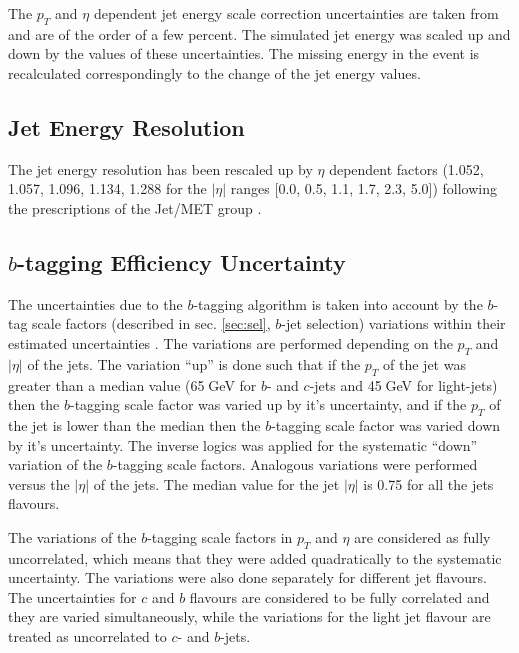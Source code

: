 The $p_{T}$ and $\eta$ dependent jet energy scale correction uncertainties are taken from \cite{CMS-PAS-JME-10-010} and are of the
order of a few percent. The simulated jet energy was scaled up and down by the values of these uncertainties. The missing energy in the 
event is recalculated correspondingly to the change of the jet energy values.

\subsection{Jet Energy Resolution}

The jet energy resolution has been rescaled up by $\eta$ dependent factors (1.052, 1.057, 1.096, 1.134, 1.288 for the $|\eta|$ ranges [0.0, 0.5, 1.1, 1.7, 2.3, 5.0]) following 
the prescriptions of the Jet/MET group \cite{TWikiSystJER}.

\subsection{$b$-tagging Efficiency Uncertainty}

The uncertainties due to the $b$-tagging algorithm is taken into account by the $b$-tag scale factors (described in sec. \ref{sec:sel}, 
$b$-jet selection) variations within their estimated
uncertainties \cite{CMS-PAS-BTV-13-001}. The variations are performed depending on the $p_{T}$ and $|\eta|$ of the jets. The variation ``up'' 
is done such that if the $p_{T}$ of the jet was greater than a median value (65$\;$GeV for $b$- and $c$-jets and 45$\;$GeV for light-jets) then 
the $b$-tagging scale factor was varied up by it's uncertainty, and if the $p_{T}$ of the jet is lower than the median then the $b$-tagging 
scale factor was varied down by it's uncertainty. The inverse logics was applied for the systematic ``down'' variation of the $b$-tagging 
scale factors. Analogous variations were performed versus the $|\eta|$ of the jets. The median value for the jet $|\eta|$ is 0.75 for all the jets flavours.

The variations of the $b$-tagging scale factors in $p_{T}$ and $\eta$ are considered as fully uncorrelated, which means that they were added
quadratically to the systematic uncertainty. The variations were also done separately for different jet flavours. The uncertainties for $c$ and $b$ 
flavours are considered to be fully correlated and they are varied simultaneously, while the variations for the light jet flavour are treated as 
uncorrelated to $c$- and $b$-jets.

